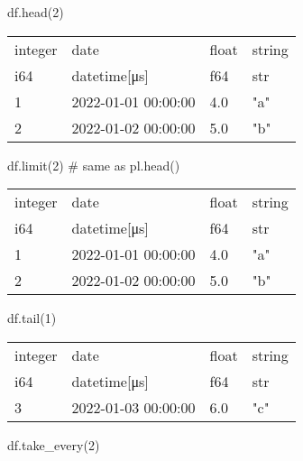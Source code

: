 \documentclass[
  letterpaper,
  DIV=11,
  numbers=noendperiod]{scrartcl}
\newenvironment{Shaded}{\begin{snugshade}}{\end{snugshade}}
\newcommand{\CommentTok}[1]{\textcolor[rgb]{0.37,0.37,0.37}{#1}}
\newcommand{\DecValTok}[1]{\textcolor[rgb]{0.68,0.00,0.00}{#1}}
\newcommand{\NormalTok}[1]{\textcolor[rgb]{0.00,0.23,0.31}{#1}}
\begin{document}
\begin{Shaded}
\begin{Highlighting}[]
\NormalTok{df.head(}\DecValTok{2}\NormalTok{)}
\end{Highlighting}
\end{Shaded}

\begin{longtable}[]{@{}llll@{}}
\toprule()
integer & date & float & string \\
i64 & datetime{[}μs{]} & f64 & str \\
\midrule()
\endhead
1 & 2022-01-01 00:00:00 & 4.0 & "a" \\
2 & 2022-01-02 00:00:00 & 5.0 & "b" \\
\bottomrule()
\end{longtable}

\begin{Shaded}
\begin{Highlighting}[]
\NormalTok{df.limit(}\DecValTok{2}\NormalTok{) }\CommentTok{\# same as pl.head()}
\end{Highlighting}
\end{Shaded}

\begin{longtable}[]{@{}llll@{}}
\toprule()
integer & date & float & string \\
i64 & datetime{[}μs{]} & f64 & str \\
\midrule()
\endhead
1 & 2022-01-01 00:00:00 & 4.0 & "a" \\
2 & 2022-01-02 00:00:00 & 5.0 & "b" \\
\bottomrule()
\end{longtable}

\begin{Shaded}
\begin{Highlighting}[]
\NormalTok{df.tail(}\DecValTok{1}\NormalTok{)}
\end{Highlighting}
\end{Shaded}

\begin{longtable}[]{@{}llll@{}}
\toprule()
integer & date & float & string \\
i64 & datetime{[}μs{]} & f64 & str \\
\midrule()
\endhead
3 & 2022-01-03 00:00:00 & 6.0 & "c" \\
\bottomrule()
\end{longtable}

\begin{Shaded}
\begin{Highlighting}[]
\NormalTok{df.take\_every(}\DecValTok{2}\NormalTok{)}
\end{Highlighting}
\end{Shaded}
\end{document}
